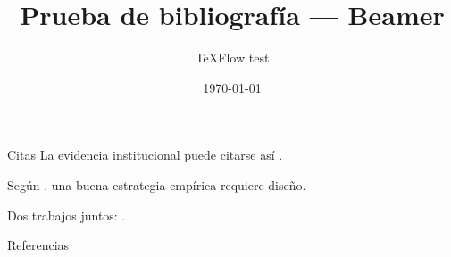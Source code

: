 \documentclass[aspectratio=169]{beamer}
\title{Prueba de bibliografía — Beamer}
\author{TeXFlow test}
\date{\today}
\begin{document}
\begin{frame}
\titlepage
\end{frame}

\begin{frame}{Citas}
La evidencia institucional puede citarse así \parencite{acemoglu2001}.

Según \textcite{angrist2009}, una buena estrategia empírica requiere diseño.

Dos trabajos juntos: \parencite{acemoglu2001,heckman1979}.
\end{frame}

\begin{frame}[allowframebreaks]{Referencias}
\printbibliography
\end{frame}
\end{document}
